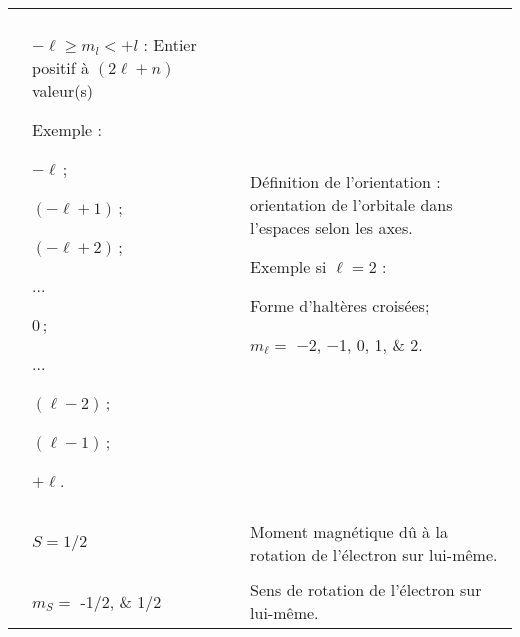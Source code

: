\begin{xltabular}{\textwidth}{X p{5.5cm} p{7.5cm}}
\addlinespace %
 \\ 
\middashrule %
&
\begin{tabdescription}
	\item[$-\ell\ge m_l<+l$ :] Entier positif à $(2\ell+n)$ valeur(s)
 	\item[Exemple :]\hfill
 		\begin{compactitemize}
			\item $-\ell$\,;
 			\item $(-\ell+1)$\,;
			\item $(-\ell+2)$\,;
 			\item ...
 			\item $0$\,;
 			\item ...
 			\item $(\ell-2)$\,;
 			\item $(\ell-1)$\,;
 			\item $+\ell$.
		\end{compactitemize}
\end{tabdescription} 
& 
\begin{tabdescription}
	\item[Définition de l'orientation :] orientation de l'orbitale dans l'espaces selon les axes.  
	\item[Exemple si $\ell=2$ :]\hfill
		\begin{compactitemize}
 			\item Forme d'haltères croisées;
 			\item $m_\ell=$ \numlist[list-separator = {; }, list-final-separator = {; }]{-2; -1;0;1;2}. %
		\end{compactitemize}
\end{tabdescription} \\ 

\addlinespace %
 \\ 
\middashrule %

& 
$S=1/2$
& 
Moment magnétique dû à la rotation de l'électron sur lui-même.\\ 

\addlinespace %
 \\ 
\middashrule %
& 
$m_S=$ \numlist[list-pair-separator = {; }]{-1/2;1/2}
& 
Sens de rotation de l'électron sur lui-même.\\ 

\bottomrule %
\end{xltabular}

